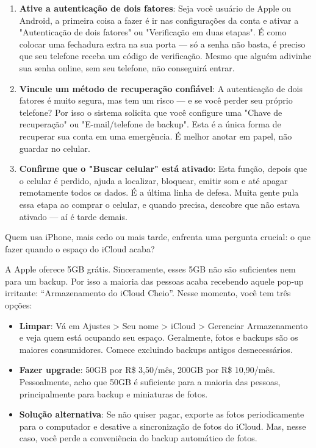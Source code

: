 \begin{enumerate}
  \item \textbf{Ative a autenticação de dois fatores}: Seja você usuário de Apple ou Android, a primeira coisa a fazer é ir nas configurações da conta e ativar a "Autenticação de dois fatores" ou "Verificação em duas etapas". É como colocar uma fechadura extra na sua porta — só a senha não basta, é preciso que seu telefone receba um código de verificação. Mesmo que alguém adivinhe sua senha online, sem seu telefone, não conseguirá entrar.
  \item \textbf{Vincule um método de recuperação confiável}: A autenticação de dois fatores é muito segura, mas tem um risco — e se você perder seu próprio telefone? Por isso o sistema solicita que você configure uma "Chave de recuperação" ou "E-mail/telefone de backup". Esta é a única forma de recuperar sua conta em uma emergência. É melhor anotar em papel, não guardar no celular.
  \item \textbf{Confirme que o "Buscar celular" está ativado}: Esta função, depois que o celular é perdido, ajuda a localizar, bloquear, emitir som e até apagar remotamente todos os dados. É a última linha de defesa. Muita gente pula essa etapa ao comprar o celular, e quando precisa, descobre que não estava ativado — aí é tarde demais.
\end{enumerate}


Quem usa iPhone, mais cedo ou mais tarde, enfrenta uma pergunta crucial: o que fazer quando o espaço do iCloud acaba?

A Apple oferece 5GB grátis. Sinceramente, esses 5GB não são suficientes nem para um backup. Por isso a maioria das pessoas acaba recebendo aquele pop-up irritante: “Armazenamento do iCloud Cheio”. Nesse momento, você tem três opções:

\begin{itemize}
  \item \textbf{Limpar}: Vá em Ajustes > Seu nome > iCloud > Gerenciar Armazenamento e veja quem está ocupando seu espaço. Geralmente, fotos e backups são os maiores consumidores. Comece excluindo backups antigos desnecessários.
  \item \textbf{Fazer upgrade}: 50GB por R\$ 3,50/mês, 200GB por R\$ 10,90/mês. Pessoalmente, acho que 50GB é suficiente para a maioria das pessoas, principalmente para backup e miniaturas de fotos.
  \item \textbf{Solução alternativa}: Se não quiser pagar, exporte as fotos periodicamente para o computador e desative a sincronização de fotos do iCloud. Mas, nesse caso, você perde a conveniência do backup automático de fotos.
\end{itemize}

